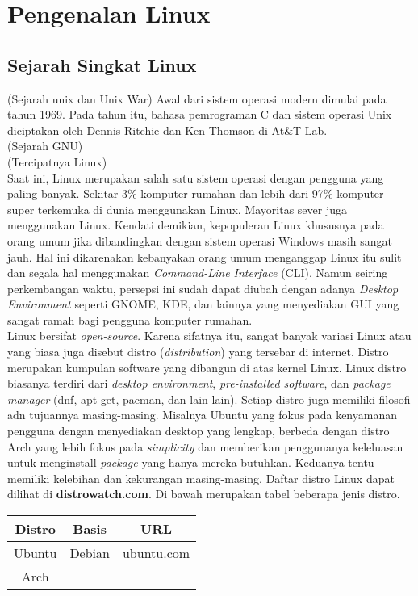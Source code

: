 \chapter{Pengenalan Linux}

\section{Sejarah Singkat Linux}
(Sejarah unix dan Unix War) Awal dari sistem operasi modern dimulai pada tahun 1969. Pada tahun itu, bahasa pemrograman C dan sistem operasi Unix diciptakan oleh Dennis Ritchie dan Ken Thomson di At\&T Lab. \\ 

(Sejarah GNU) \\ 

(Tercipatnya Linux) \\ 

Saat ini, Linux merupakan salah satu sistem operasi dengan pengguna yang paling banyak. Sekitar 3\% komputer rumahan dan lebih dari 97\% 
komputer super terkemuka di dunia menggunakan Linux. Mayoritas sever juga menggunakan Linux. Kendati demikian, kepopuleran Linux khususnya pada
orang umum jika dibandingkan dengan sistem operasi Windows masih sangat jauh. Hal ini dikarenakan kebanyakan orang umum menganggap Linux itu 
sulit dan segala hal menggunakan \textit{Command-Line Interface} (CLI). Namun seiring perkembangan waktu, persepsi ini sudah dapat diubah 
dengan adanya \textit{Desktop Environment} seperti GNOME, KDE, dan lainnya yang menyediakan GUI yang sangat ramah bagi pengguna 
komputer rumahan.\\

Linux bersifat \textit{open-source}. Karena sifatnya itu, sangat banyak variasi Linux atau yang biasa juga disebut distro 
(\textit{distribution}) yang tersebar di internet. Distro merupakan kumpulan software yang dibangun di atas kernel Linux. Linux distro 
biasanya terdiri dari \textit{desktop environment}, \textit{pre-installed software}, dan \textit{package manager} (dnf, apt-get, pacman, 
dan lain-lain). Setiap distro juga memiliki filosofi adn tujuannya masing-masing. Misalnya Ubuntu yang fokus pada kenyamanan pengguna dengan 
menyediakan desktop yang lengkap, berbeda dengan distro Arch yang lebih fokus pada \textit{simplicity} dan memberikan penggunanya keleluasan 
untuk menginstall \textit{package} yang hanya mereka butuhkan. Keduanya tentu memiliki kelebihan dan kekurangan masing-masing. Daftar distro 
Linux dapat dilihat di \textbf{distrowatch.com}. Di bawah merupakan tabel beberapa jenis distro.

\begin{center}
	\begin{tabular}{c|c|c}
		\textbf{Distro} & \textbf{Basis} & \textbf{URL} \\
		\hline
		Ubuntu & Debian & ubuntu.com \\
		\hline
		Arch 
	\end{tabular}
\end{center}
